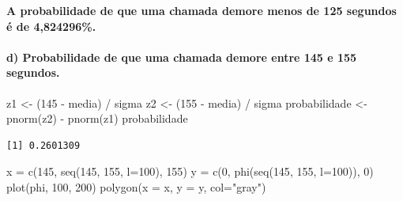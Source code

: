 \documentclass[
  letterpaper,
  DIV=11,
  numbers=noendperiod]{scrartcl}
\let\oldparagraph\paragraph
\renewcommand{\paragraph}[1]{\oldparagraph{#1}\mbox{}}
\newenvironment{Shaded}{\begin{snugshade}}{\end{snugshade}}
\newcommand{\AttributeTok}[1]{\textcolor[rgb]{0.40,0.45,0.13}{#1}}
\newcommand{\DecValTok}[1]{\textcolor[rgb]{0.68,0.00,0.00}{#1}}
\newcommand{\FunctionTok}[1]{\textcolor[rgb]{0.28,0.35,0.67}{#1}}
\newcommand{\NormalTok}[1]{\textcolor[rgb]{0.00,0.23,0.31}{#1}}
\newcommand{\OtherTok}[1]{\textcolor[rgb]{0.00,0.23,0.31}{#1}}
\newcommand{\SpecialCharTok}[1]{\textcolor[rgb]{0.37,0.37,0.37}{#1}}
\newcommand{\StringTok}[1]{\textcolor[rgb]{0.13,0.47,0.30}{#1}}
\begin{document}
\textbf{A probabilidade de que uma chamada demore menos de 125 segundos
é de 4,824296\%.}

\hypertarget{d-probabilidade-de-que-uma-chamada-demore-entre-145-e-155-segundos.}{%
\paragraph{d) Probabilidade de que uma chamada demore entre 145 e 155
segundos.}\label{d-probabilidade-de-que-uma-chamada-demore-entre-145-e-155-segundos.}}

\begin{Shaded}
\begin{Highlighting}[]
\NormalTok{z1 }\OtherTok{\textless{}{-}}\NormalTok{ (}\DecValTok{145}  \SpecialCharTok{{-}}\NormalTok{ media) }\SpecialCharTok{/}\NormalTok{ sigma}
\NormalTok{z2 }\OtherTok{\textless{}{-}}\NormalTok{ (}\DecValTok{155}  \SpecialCharTok{{-}}\NormalTok{ media) }\SpecialCharTok{/}\NormalTok{ sigma}
\NormalTok{probabilidade }\OtherTok{\textless{}{-}} \FunctionTok{pnorm}\NormalTok{(z2) }\SpecialCharTok{{-}} \FunctionTok{pnorm}\NormalTok{(z1)}
\NormalTok{probabilidade}
\end{Highlighting}
\end{Shaded}

\begin{verbatim}
[1] 0.2601309
\end{verbatim}

\begin{Shaded}
\begin{Highlighting}[]
\NormalTok{x }\OtherTok{=} \FunctionTok{c}\NormalTok{(}\DecValTok{145}\NormalTok{, }\FunctionTok{seq}\NormalTok{(}\DecValTok{145}\NormalTok{, }\DecValTok{155}\NormalTok{, }\AttributeTok{l=}\DecValTok{100}\NormalTok{), }\DecValTok{155}\NormalTok{)}
\NormalTok{y }\OtherTok{=} \FunctionTok{c}\NormalTok{(}\DecValTok{0}\NormalTok{, }\FunctionTok{phi}\NormalTok{(}\FunctionTok{seq}\NormalTok{(}\DecValTok{145}\NormalTok{, }\DecValTok{155}\NormalTok{, }\AttributeTok{l=}\DecValTok{100}\NormalTok{)), }\DecValTok{0}\NormalTok{)}
\FunctionTok{plot}\NormalTok{(phi, }\DecValTok{100}\NormalTok{, }\DecValTok{200}\NormalTok{)}
\FunctionTok{polygon}\NormalTok{(}\AttributeTok{x =}\NormalTok{ x, }\AttributeTok{y =}\NormalTok{ y, }\AttributeTok{col=}\StringTok{"gray"}\NormalTok{)}
\end{Highlighting}
\end{Shaded}
\end{document}
